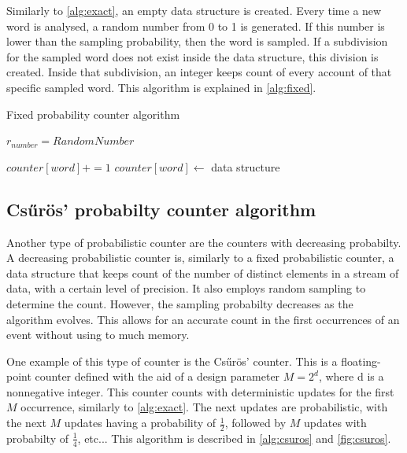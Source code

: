 Similarly to \autoref{alg:exact}, an empty data structure is created.
Every time a new word is analysed, a random number from 0 to 1 is generated.
If this number is lower than the sampling probability, then the word is sampled.
If a subdivision for the sampled word does not exist inside the data structure, this division is created.
Inside that subdivision, an integer keeps count of every account of that specific sampled word.
This algorithm is explained in \autoref{alg:fixed}.

\clearpage

\begin{algorithm}[ht!]
\caption{Fixed probability counter algorithm}
\label{alg:fixed}
\begin{algorithmic}



    $r_{number} = RandomNumber$

            \State $counter[word]+=1$
        \Else
            \State $counter[word] \gets$ data structure
        \EndIf

    \EndIf
\EndFor
\end{algorithmic}
\end{algorithm}


\subsection{Csűrös' probabilty counter algorithm}
Another type of probabilistic counter are the counters with decreasing probabilty.
A decreasing probabilistic counter is, similarly to a fixed probabilistic counter, a data structure that keeps count of the number of distinct elements in a stream of data, with a certain level of precision. 
It also employs random sampling to determine the count.
However, the sampling probabilty decreases as the algorithm evolves.
This allows for an accurate count in the first occurrences of an event without using to much memory.

One example of this type of counter is the Csűrös' counter. %
This is a floating-point counter defined with the aid of a design parameter $M = 2^d$, where d is a nonnegative integer.
This counter counts with deterministic updates for the first $M$ occurrence, similarly to \autoref{alg:exact}.
The next updates are probabilistic, with the next $M$ updates having a probability of $\frac{1}{2}$, followed by $M$ updates with probabilty of $\frac{1}{4}$, etc...
This algorithm is described in \autoref{alg:csuros} and \autoref{fig:csuros}.


